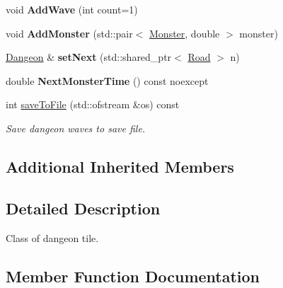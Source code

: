 \begin{DoxyCompactItemize}
void {\bfseries Add\+Wave} (int count=1)
\item 
\mbox{\label{classbase__structures_1_1Dangeon_aa32f641001257b34ec3dc2201888512e}} 
void {\bfseries Add\+Monster} (std\+::pair$<$ \hyperlink{classbase__structures_1_1Monster}{Monster}, double $>$ monster)
\item 
\mbox{\label{classbase__structures_1_1Dangeon_a03d8a0f7cd8b53bd04ba402b5ded3f39}} 
\hyperlink{classbase__structures_1_1Dangeon}{Dangeon} \& {\bfseries set\+Next} (std\+::shared\+\_\+ptr$<$ \hyperlink{classbase__structures_1_1Road}{Road} $>$ n)
\item 
\mbox{\label{classbase__structures_1_1Dangeon_a14af3aa3c068993f19994343dde97134}} 
double {\bfseries Next\+Monster\+Time} () const noexcept
\item 
\mbox{\label{classbase__structures_1_1Dangeon_a62ac56c6c0e9b5b9f91be1e72775ccce}} 
int \hyperlink{classbase__structures_1_1Dangeon_a62ac56c6c0e9b5b9f91be1e72775ccce}{save\+To\+File} (std\+::ofstream \&os) const
\begin{DoxyCompactList}\small\item\em Save dangeon waves to save file. \end{DoxyCompactList}\end{DoxyCompactItemize}
\subsection*{Additional Inherited Members}


\subsection{Detailed Description}
Class of dangeon tile. 

\subsection{Member Function Documentation}
\mbox{\label{classbase__structures_1_1Dangeon_aa1d44555dd5611253aa0f6196be99238}} 
